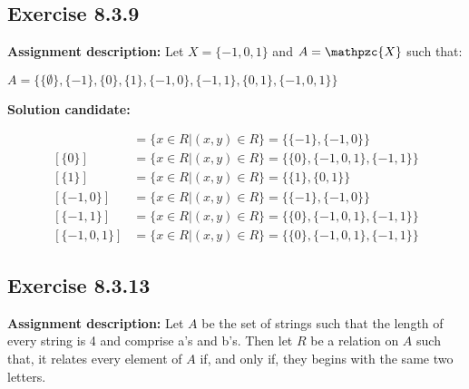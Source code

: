 \documentclass{report}
\newcommand{\cent}[1]{\begin{center}#1\end{center}}
\newcommand{\mAlign}[1]{\begin{align*}#1\end{align*}}
\newcommand{\In}{\! \in \!}
\newcommand{\script}[1]{\mathpzc{#1}}
\newcommand{\AssignmentDescription}{\textbf{Assignment description: }}
\newcommand{\Solution}{\textbf{Solution candidate: }}
\newcommand{\Exercise}[1]{\subsection{Exercise #1}}
\begin{document}
	\Exercise{8.3.9}
	
	\AssignmentDescription
	Let $X=\{-1,0,1\}$ and $A=\script{X}$ such that:
	
	\cent{$A  = \{\{\emptyset\},\{-1\},\{0\},\{1\},\{-1,0\},\{-1,1\},\{0,1\},\{-1,0,1\}\}$}
	
	\Solution
	
	\mAlign{[\{-1\}] &= \{x \in R | (x,y) \In R\} = \{\{-1\},\{-1,0\}\} \\
		[\{0\}] &= \{x \in R | (x,y) \In R\} = \{\{0\},\{-1,0,1\},\{-1,1\}\} \\
		[\{1\}] &= \{x \in R | (x,y) \In R\} = \{\{1\},\{0,1\}\} \\
		[\{-1,0\}] &= \{x \in R | (x,y) \In R\} = \{\{-1\},\{-1,0\}\} \\
		[\{-1,1\}] &= \{x \in R | (x,y) \In R\} = \{\{0\},\{-1,0,1\},\{-1,1\}\} \\
		[\{-1,0,1\}] &= \{x \in R | (x,y) \In R\} = \{\{0\},\{-1,0,1\},\{-1,1\}\}}
	
	\Exercise{8.3.13}
	
	\AssignmentDescription
	Let $A$ be the set of strings such that the length of every string is 4 and comprise a's and b's. Then let $R$ be a relation on $A$ such that, it relates every element of $A$ if, and only if, they begins with the same two letters.\\
	
\end{document}
